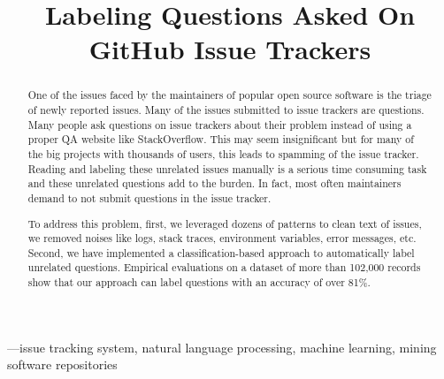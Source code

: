 \documentclass[conference]{IEEEtran}
\begin{document}
\title{Labeling Questions Asked On GitHub Issue Trackers\\
}

\author{
}

\maketitle


\begin{abstract}
  One of the issues faced by the maintainers of popular open source software is the triage 
  of newly reported issues. Many of the issues submitted to issue trackers are questions.
  Many people ask questions on issue trackers about their problem instead of using a proper QA 
  website like StackOverflow. This may seem insignificant but for many of the big projects 
  with thousands of users, this leads to spamming of the issue tracker. Reading and labeling
  these unrelated issues manually is a serious time consuming task and these unrelated questions 
  add to the burden. In fact, most often maintainers demand to not submit questions in the 
  issue tracker.

  To address this problem, first, we leveraged dozens of patterns
  to clean text of issues, we removed noises like logs, stack traces, environment variables, 
  error messages, etc.
  Second, we have implemented a classification-based approach to automatically label unrelated questions. 
  Empirical evaluations on a dataset of more than 102,000 records show that our approach 
  can label questions with an accuracy of over 81\%. 
\end{abstract}  

\begin{IEEEkeywords}
  —issue tracking system, natural language processing, machine learning, mining software repositories
\end{IEEEkeywords}
\end{document}
